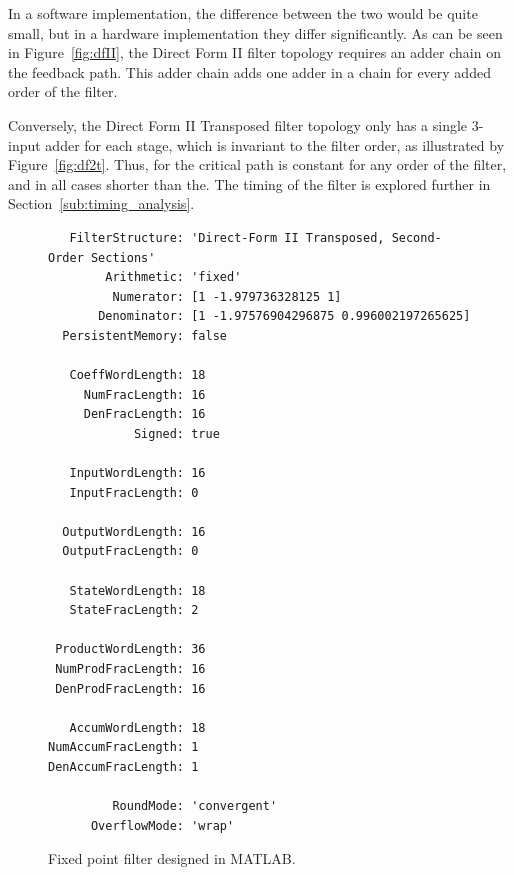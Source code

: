\documentclass[]{article}
\begin{document}
In a software implementation, the difference between the two would be quite small, but in a hardware implementation they differ significantly. As can be seen in Figure~\ref{fig:dfII}, the Direct Form II filter topology requires an adder chain on the feedback path. This adder chain adds one adder in a chain for every added order of the filter.

Conversely, the Direct Form II Transposed filter topology only has a single 3-input adder for each stage, which is invariant to the filter order, as illustrated by Figure~\ref{fig:df2t}.
Thus, for the critical path is constant for any order of the filter, and in all cases shorter than the. The timing of the filter is explored further in Section~\ref{sub:timing_analysis}.


\begin{figure}[htbp]
	\begin{center}
		\begin{lstlisting}
   FilterStructure: 'Direct-Form II Transposed, Second-Order Sections'
        Arithmetic: 'fixed'
         Numerator: [1 -1.979736328125 1]                  
       Denominator: [1 -1.97576904296875 0.996002197265625]
  PersistentMemory: false

   CoeffWordLength: 18                
     NumFracLength: 16                
     DenFracLength: 16
            Signed: true              
                                      
   InputWordLength: 16                
   InputFracLength: 0                 
                                      
  OutputWordLength: 16
  OutputFracLength: 0                 
                                      
   StateWordLength: 18
   StateFracLength: 2                 
                                      
 ProductWordLength: 36                
 NumProdFracLength: 16                
 DenProdFracLength: 16                
                                      
   AccumWordLength: 18                
NumAccumFracLength: 1                 
DenAccumFracLength: 1                 

         RoundMode: 'convergent'      
      OverflowMode: 'wrap'  
		\end{lstlisting}
	\end{center}
	\caption{Fixed point filter designed in MATLAB.}
	\label{fig:Hdsdsos}
\end{figure}
\end{document}
